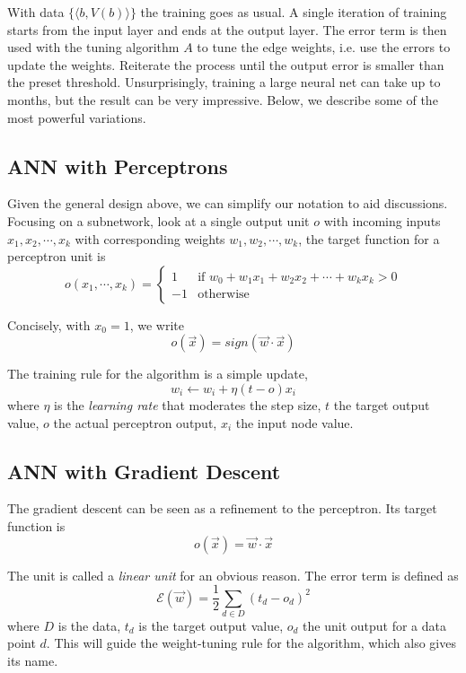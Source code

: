 \documentclass[12pt]{article}  %
\begin{document}
With data $\{\langle b, V(b) \rangle\}$ the training goes as usual. A single iteration of training starts from the input layer and ends at the output layer. The error term is then used with the tuning algorithm $A$ to tune the edge weights, i.e. use the errors to update the weights. Reiterate the process until the output error is smaller than the preset threshold. Unsurprisingly, training a large neural net can take up to months, but the result can be very impressive. Below, we describe some of the most powerful variations.





\subsection{ANN with Perceptrons}

Given the general design above, we can simplify our notation to aid discussions. Focusing on a subnetwork, look at a single output unit $o$ with incoming inputs $x_1, x_2, \cdots, x_k$ with corresponding weights $w_1, w_2, \cdots, w_k$, the target function for a perceptron unit is
\[
o(x_1, \cdots, x_k) =
\begin{cases}
1 &\text{if } w_0 + w_1 x_1 + w_2 x_2 + \cdots + w_k x_k > 0\\
-1 &\text{otherwise }
\end{cases}
\]

Concisely, with $x_0=1$, we write $$o(\vec{x}) = sign(\vec{w} \cdot \vec{x})$$

The training rule for the algorithm is a simple update, $$w_i \leftarrow w_i + \eta(t-o)x_i$$ where $\eta$ is the {\em learning rate} that moderates the step size, $t$ the target output value, $o$ the actual perceptron output, $x_i$ the input node value.




\subsection{ANN with Gradient Descent}

The gradient descent can be seen as a refinement to the perceptron. Its target function is $$o(\vec{x}) = \vec{w} \cdot \vec{x}$$

The unit is called a {\em linear unit} for an obvious reason. The error term is defined as $$\mathcal{E}(\vec{w}) = \frac{1}{2} \sum_{d \in D} (t_d - o_d)^2$$ where $D$ is the data, $t_d$ is the target output value, $o_d$ the unit output for a data point $d$. This will guide the weight-tuning rule for the algorithm, which also gives its name.
\end{document}
